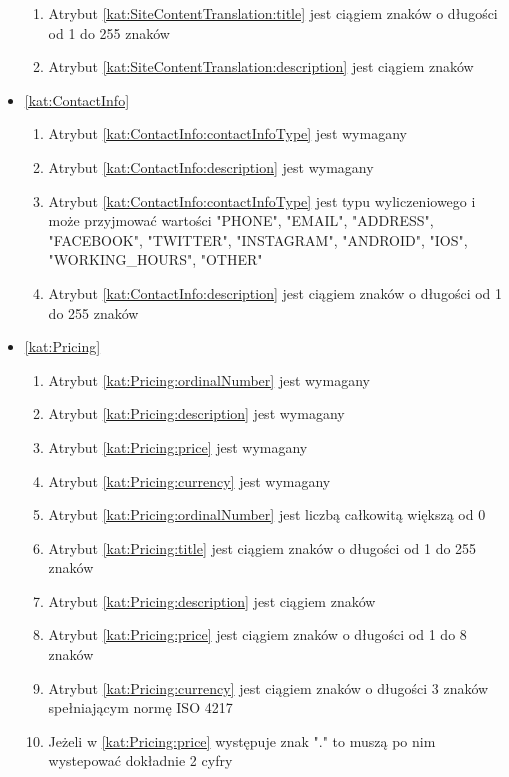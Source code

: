 \begin{itemize}[label={\textbf{Ograniczenia dla}}, wide, labelwidth=!, labelindent=0pt]
\begin{enumerate}[label={\textbf{OGR/\protect\threedigits{\arabic{enumi}}}}, wide, labelwidth=!, align=left, leftmargin=3cm, resume]
        \item Atrybut \ref{kat:SiteContentTranslation:title} jest ciągiem znaków o długości od 1 do 255 znaków
        \item Atrybut \ref{kat:SiteContentTranslation:description} jest ciągiem znaków
    \end{enumerate}

    \item\ref{kat:ContactInfo}
    \begin{enumerate}[label={\textbf{OGR/\protect\threedigits{\arabic{enumi}}}}, wide, labelwidth=!, align=left, leftmargin=3cm, resume]
        \item Atrybut \ref{kat:ContactInfo:contactInfoType} jest wymagany
        \item Atrybut \ref{kat:ContactInfo:description} jest wymagany

        \item Atrybut \ref{kat:ContactInfo:contactInfoType} jest typu wyliczeniowego i może przyjmować wartości "PHONE", "EMAIL", "ADDRESS", "FACEBOOK", "TWITTER", "INSTAGRAM", "ANDROID", "IOS", "WORKING\_HOURS", "OTHER"
        \item Atrybut \ref{kat:ContactInfo:description} jest ciągiem znaków o długości od 1 do 255 znaków
    \end{enumerate}

    \item\ref{kat:Pricing}
    \begin{enumerate}[label={\textbf{OGR/\protect\threedigits{\arabic{enumi}}}}, wide, labelwidth=!, align=left, leftmargin=3cm, resume]
        \item Atrybut \ref{kat:Pricing:ordinalNumber} jest wymagany
        \item Atrybut \ref{kat:Pricing:description} jest wymagany
        \item Atrybut \ref{kat:Pricing:price} jest wymagany
        \item Atrybut \ref{kat:Pricing:currency} jest wymagany

        \item Atrybut \ref{kat:Pricing:ordinalNumber} jest liczbą całkowitą większą od 0
        \item Atrybut \ref{kat:Pricing:title} jest ciągiem znaków o długości od 1 do 255 znaków
        \item Atrybut \ref{kat:Pricing:description} jest ciągiem znaków
        \item Atrybut \ref{kat:Pricing:price} jest ciągiem znaków o długości od 1 do 8 znaków
        \item Atrybut \ref{kat:Pricing:currency} jest ciągiem znaków o długości 3 znaków spełniającym normę ISO 4217
        \item Jeżeli w \ref{kat:Pricing:price} występuje znak "." to muszą po nim wystepować dokładnie 2 cyfry
    \end{enumerate}


\end{itemize}
